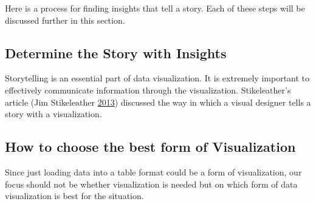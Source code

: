 \documentclass[]{book}
\theoremstyle{definition}
\theoremstyle{definition}
\theoremstyle{definition}
\theoremstyle{remark}
\begin{document}
Here is a process for finding insights that tell a story. Each of these
steps will be discussed further in this section.

\subsection{Determine the Story with
Insights}\label{determine-the-story-with-insights}

Storytelling is an essential part of data visualization. It is extremely
important to effectively communicate information through the
visualization. Stikeleather's article (Jim Stikeleather
\protect\hyperlink{ref-storytelling_with_data}{2013}) discussed the way
in which a visual designer tells a story with a visualization.

\subsection{How to choose the best form of
Visualization}\label{how-to-choose-the-best-form-of-visualization}

Since just loading data into a table format could be a form of
visualization, our focus should not be whether visualization is needed
but on which form of data visualization is best for the situation.
\end{document}
